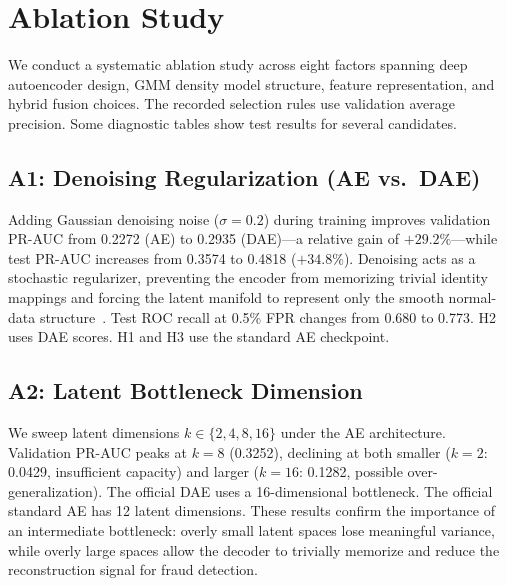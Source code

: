 
\section{Ablation Study}
\label{sec:p2_ablation}

We conduct a systematic ablation study across eight factors spanning deep autoencoder design, GMM density model structure, feature representation, and hybrid fusion choices. The recorded selection rules use validation average precision. Some diagnostic tables show test results for several candidates.

\subsection{A1: Denoising Regularization (AE vs.\ DAE)}
\label{sec:abl_ae_dae}

Adding Gaussian denoising noise ($\sigma = 0.2$) during training improves validation PR-AUC from 0.2272 (AE) to 0.2935 (DAE)---a relative gain of $+29.2\%$---while test PR-AUC increases from 0.3574 to 0.4818 ($+34.8\%$). Denoising acts as a stochastic regularizer, preventing the encoder from memorizing trivial identity mappings and forcing the latent manifold to represent only the smooth normal-data structure~\cite{vincent2010stacked}. Test ROC recall at 0.5\% FPR changes from 0.680 to 0.773. H2 uses DAE scores. H1 and H3 use the standard AE checkpoint.

\subsection{A2: Latent Bottleneck Dimension}
\label{sec:abl_latent_dim}

We sweep latent dimensions $k \in \{2, 4, 8, 16\}$ under the AE architecture. Validation PR-AUC peaks at $k=8$ (0.3252), declining at both smaller ($k=2$: 0.0429, insufficient capacity) and larger ($k=16$: 0.1282, possible over-generalization). The official DAE uses a 16-dimensional bottleneck. The official standard AE has 12 latent dimensions. These results confirm the importance of an intermediate bottleneck: overly small latent spaces lose meaningful variance, while overly large spaces allow the decoder to trivially memorize and reduce the reconstruction signal for fraud detection.

